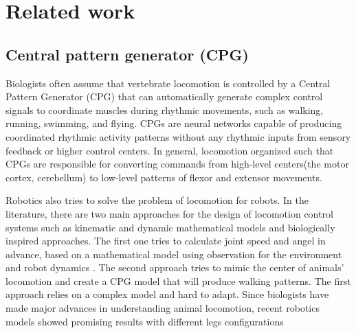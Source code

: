 
\chapter{Related work}

\section{Central pattern generator (CPG)}

Biologists often assume that vertebrate locomotion is controlled by a Central Pattern Generator (CPG) that can automatically generate complex control signals to coordinate muscles during rhythmic movements, such as walking, running, swimming, and flying. CPGs are neural networks capable of producing coordinated rhythmic activity patterns without any rhythmic inputs from sensory feedback or higher control centers. In general, locomotion organized such that CPGs are responsible for converting commands from high-level centers(the motor cortex, cerebellum) to low-level patterns of flexor and extensor movements\cite{ref1}. 

Robotics also tries to solve the problem of locomotion for robots. In the literature, there are two main approaches for the design of locomotion control systems such as kinematic and dynamic mathematical models and biologically inspired approaches\cite{ref1}. The first one tries to calculate joint speed and angel in advance, based on a mathematical model using observation for the environment and robot dynamics \cite{ref10}. The second approach tries to mimic the center of animals' locomotion and create a CPG model that will produce walking patterns. The first approach relies on a complex model and hard to adapt. Since biologists have made major advances in understanding animal locomotion, recent robotics models showed promising results with different legs configurations\cite{ref11}\cite{ref12}

